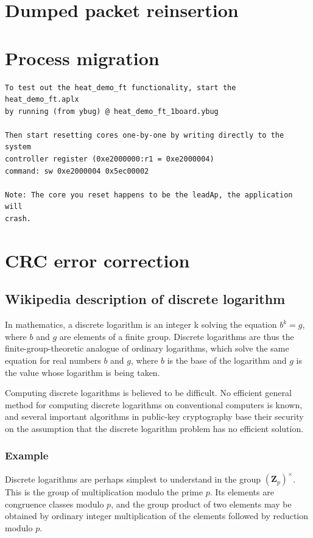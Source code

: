 \documentclass[oneside, a4paper, 11pt]{memoir}
\begin{document}
\chapter{Dumped packet reinsertion}

\chapter{Process migration}
\begin{verbatim}
To test out the heat_demo_ft functionality, start the heat_demo_ft.aplx
by running (from ybug) @ heat_demo_ft_1board.ybug

Then start resetting cores one-by-one by writing directly to the system
controller register (0xe2000000:r1 = 0xe2000004)
command: sw 0xe2000004 0x5ec00002

Note: The core you reset happens to be the leadAp, the application will
crash.
\end{verbatim}

\chapter{CRC error correction}

\section{Wikipedia description of discrete logarithm}
In mathematics, a discrete logarithm is an integer k solving the equation $b^k = g$, where $b$ and $g$ are elements of a finite group. Discrete logarithms are thus the finite-group-theoretic analogue of ordinary logarithms, which solve the same equation for real numbers $b$ and $g$, where $b$ is the base of the logarithm and $g$ is the value whose logarithm is being taken.

Computing discrete logarithms is believed to be difficult. No efficient general method for computing discrete logarithms on conventional computers is known, and several important algorithms in public-key cryptography base their security on the assumption that the discrete logarithm problem has no efficient solution.

\subsection{Example}
Discrete logarithms are perhaps simplest to understand in the group $(\mathbf{Z}_p)^\times$. This is the group of multiplication modulo the prime $p$. Its elements are congruence classes modulo $p$, and the group product of two elements may be obtained by ordinary integer multiplication of the elements followed by reduction modulo $p$.
\end{document}
